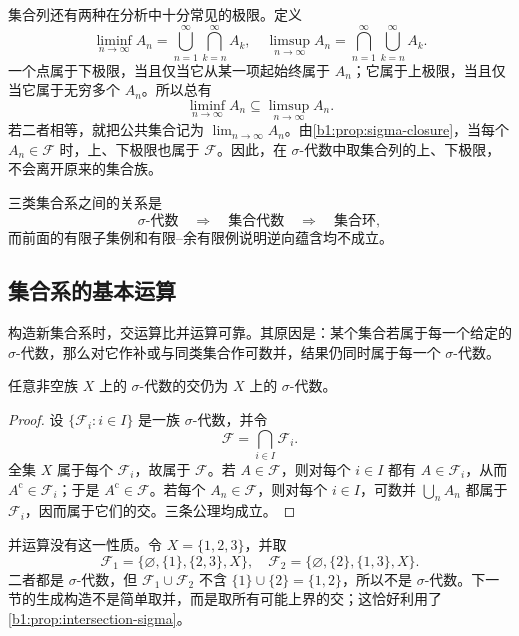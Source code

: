 集合列还有两种在分析中十分常见的极限。定义
\[
\liminf_{n\to\infty}A_n
=\bigcup_{n=1}^{\infty}\bigcap_{k=n}^{\infty}A_k,
\quad
\limsup_{n\to\infty}A_n
=\bigcap_{n=1}^{\infty}\bigcup_{k=n}^{\infty}A_k.
\]
一个点属于下极限，当且仅当它从某一项起始终属于 \(A_n\)；它属于上极限，当且仅当它属于无穷多个 \(A_n\)。所以总有
\[
\liminf_{n\to\infty}A_n
\subseteq
\limsup_{n\to\infty}A_n.
\]
若二者相等，就把公共集合记为 \(\lim_{n\to\infty}A_n\)。由\cref{b1:prop:sigma-closure}，当每个 \(A_n\in\mathcal F\) 时，上、下极限也属于 \(\mathcal F\)。因此，在 \(\sigma\)-代数中取集合列的上、下极限，不会离开原来的集合族。

\ProseParagraphBreak

三类集合系之间的关系是
\[
\sigma\text{-代数}
\quad\Longrightarrow\quad
\text{集合代数}
\quad\Longrightarrow\quad
\text{集合环},
\]
而前面的有限子集例和有限--余有限例说明逆向蕴含均不成立。

\subsection{集合系的基本运算}
\label{b1:subsec:010104}

构造新集合系时，交运算比并运算可靠。其原因是：某个集合若属于每一个给定的 \(\sigma\)-代数，那么对它作补或与同类集合作可数并，结果仍同时属于每一个 \(\sigma\)-代数。

\begin{proposition}
\label{b1:prop:intersection-sigma}
任意非空族 \(X\) 上的 \(\sigma\)-代数的交仍为 \(X\) 上的 \(\sigma\)-代数。
\end{proposition}
\begin{proof}
设 \(\{\mathcal F_i:i\in I\}\) 是一族 \(\sigma\)-代数，并令
\[
\mathcal F=\bigcap_{i\in I}\mathcal F_i.
\]
全集 \(X\) 属于每个 \(\mathcal F_i\)，故属于 \(\mathcal F\)。若 \(A\in\mathcal F\)，则对每个 \(i\in I\) 都有 \(A\in\mathcal F_i\)，从而 \(A^{\mathrm c}\in\mathcal F_i\)；于是 \(A^{\mathrm c}\in\mathcal F\)。若每个 \(A_n\in\mathcal F\)，则对每个 \(i\in I\)，可数并 \(\bigcup_nA_n\) 都属于 \(\mathcal F_i\)，因而属于它们的交。三条公理均成立。
\end{proof}

并运算没有这一性质。令 \(X=\{1,2,3\}\)，并取
\[
\mathcal F_1=\bigl\{\varnothing,\{1\},\{2,3\},X\bigr\},
\quad
\mathcal F_2=\bigl\{\varnothing,\{2\},\{1,3\},X\bigr\}.
\]
二者都是 \(\sigma\)-代数，但 \(\mathcal F_1\cup\mathcal F_2\) 不含 \(\{1\}\cup\{2\}=\{1,2\}\)，所以不是 \(\sigma\)-代数。下一节的生成构造不是简单取并，而是取所有可能上界的交；这恰好利用了\cref{b1:prop:intersection-sigma}。

